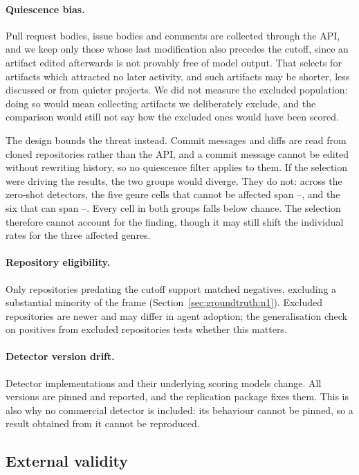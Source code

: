 \paragraph{Quiescence bias.} Pull request bodies, issue bodies and comments are
collected through the API, and we keep only those whose last modification also precedes
the cutoff, since an artifact edited afterwards is not provably free of model output.
That selects for artifacts which attracted no later activity, and such artifacts may be
shorter, less discussed or from quieter projects. We did not measure the excluded
population: doing so would mean collecting artifacts we deliberately exclude, and the
comparison would still not say how the excluded ones would have been scored.

The design bounds the threat instead. Commit messages and diffs are read from cloned
repositories rather than the API, and a commit message cannot be edited without
rewriting history, so no quiescence filter applies to them. If the selection were
driving the results, the two groups would diverge. They do not: across the zero-shot
detectors, the five genre cells that cannot be affected span
--, and the six that can span
--. Every cell in both groups falls below chance. The
selection therefore cannot account for the finding, though it may still shift the
individual rates for the three affected genres.

\paragraph{Repository eligibility.} Only repositories predating the cutoff support
matched negatives, excluding a substantial minority of the frame
(Section~\ref{sec:groundtruth:n1}). Excluded repositories are newer and may differ in
agent adoption; the generalisation check on positives from excluded repositories tests
whether this matters.

\paragraph{Detector version drift.} Detector implementations and their underlying
scoring models change. All versions are pinned and reported, and the replication package
fixes them. This is also why no commercial detector is included: its behaviour cannot be
pinned, so a result obtained from it cannot be reproduced.

\subsection{External validity}
\label{sec:threats:external}

